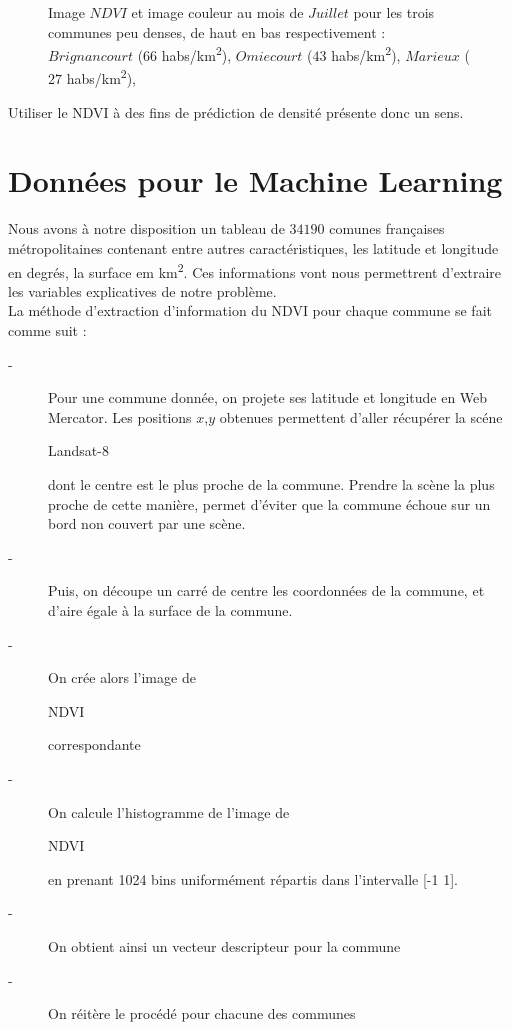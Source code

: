 \documentclass{book}
\begin{document}
\begin{figure}[H]
{}
\caption{Image $NDVI$ et image couleur au mois de $Juillet$ pour les trois communes peu denses, de haut en bas respectivement :
$Brignancourt$ ($66$ habs/km\textsuperscript{2}),
$Omiecourt$ ($43$ habs/km\textsuperscript{2}),
$Marieux$ ($27$ habs/km\textsuperscript{2}),
}
\label{ndvi_cat4}
\end{figure}

Utiliser le NDVI à des fins de prédiction de densité présente donc un sens.

\section{Données pour le Machine Learning}

Nous avons à notre disposition un tableau de $34190$ comunes françaises métropolitaines contenant entre autres caractéristiques, les latitude et longitude en degrés,
la surface em km\textsuperscript{2}. Ces informations vont nous permettrent d'extraire les variables explicatives de notre problème.\\
La méthode d'extraction d'information du NDVI pour chaque commune se fait comme suit :
\begin{description}
\item[-] Pour une commune donnée, on projete ses latitude et longitude en Web Mercator. Les positions $x$,$y$ obtenues permettent d'aller récupérer 
la scéne \begin{itshape}Landsat-8\end{itshape} dont le centre est le plus proche de la commune. Prendre la scène la plus proche de cette manière,
permet d'éviter que la commune échoue sur un bord non couvert par une scène.
\item[-] Puis, on découpe un carré de centre les coordonnées de la  commune, et d'aire égale à la surface de la commune.
\item[-] On crée alors l'image de \begin{itshape}NDVI\end{itshape} correspondante
\item[-] On calcule l'histogramme de l'image de \begin{itshape}NDVI\end{itshape} en prenant 1024 bins uniformément répartis dans l'intervalle [-1 1].
\item[-] On obtient ainsi un vecteur descripteur pour la commune
\item[-] On réitère le procédé pour chacune des communes
\end{description}
\end{document}

